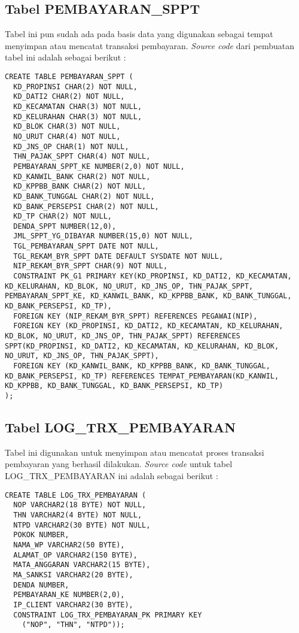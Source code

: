 \documentclass[pdftex,12pt, oneside]{article}
\begin{document}
  \subsection{Tabel PEMBAYARAN\_SPPT}
  
  Tabel ini pun sudah ada pada basis data yang digunakan sebagai tempat menyimpan atau mencatat transaksi pembayaran. \textit{Source code} dari pembuatan tabel ini adalah sebagai berikut :
  
  \begin{lstlisting}
CREATE TABLE PEMBAYARAN_SPPT (
  KD_PROPINSI CHAR(2) NOT NULL,
  KD_DATI2 CHAR(2) NOT NULL,
  KD_KECAMATAN CHAR(3) NOT NULL,
  KD_KELURAHAN CHAR(3) NOT NULL,
  KD_BLOK CHAR(3) NOT NULL,
  NO_URUT CHAR(4) NOT NULL,
  KD_JNS_OP CHAR(1) NOT NULL,
  THN_PAJAK_SPPT CHAR(4) NOT NULL,
  PEMBAYARAN_SPPT_KE NUMBER(2,0) NOT NULL,
  KD_KANWIL_BANK CHAR(2) NOT NULL,
  KD_KPPBB_BANK CHAR(2) NOT NULL,
  KD_BANK_TUNGGAL CHAR(2) NOT NULL,
  KD_BANK_PERSEPSI CHAR(2) NOT NULL,
  KD_TP CHAR(2) NOT NULL,
  DENDA_SPPT NUMBER(12,0),
  JML_SPPT_YG_DIBAYAR NUMBER(15,0) NOT NULL,
  TGL_PEMBAYARAN_SPPT DATE NOT NULL,
  TGL_REKAM_BYR_SPPT DATE DEFAULT SYSDATE NOT NULL,
  NIP_REKAM_BYR_SPPT CHAR(9) NOT NULL,
  CONSTRAINT PK_G1 PRIMARY KEY(KD_PROPINSI, KD_DATI2, KD_KECAMATAN, KD_KELURAHAN, KD_BLOK, NO_URUT, KD_JNS_OP, THN_PAJAK_SPPT, PEMBAYARAN_SPPT_KE, KD_KANWIL_BANK, KD_KPPBB_BANK, KD_BANK_TUNGGAL, KD_BANK_PERSEPSI, KD_TP),
  FOREIGN KEY (NIP_REKAM_BYR_SPPT) REFERENCES PEGAWAI(NIP),
  FOREIGN KEY (KD_PROPINSI, KD_DATI2, KD_KECAMATAN, KD_KELURAHAN, KD_BLOK, NO_URUT, KD_JNS_OP, THN_PAJAK_SPPT) REFERENCES SPPT(KD_PROPINSI, KD_DATI2, KD_KECAMATAN, KD_KELURAHAN, KD_BLOK, NO_URUT, KD_JNS_OP, THN_PAJAK_SPPT),
  FOREIGN KEY (KD_KANWIL_BANK, KD_KPPBB_BANK, KD_BANK_TUNGGAL, KD_BANK_PERSEPSI, KD_TP) REFERENCES TEMPAT_PEMBAYARAN(KD_KANWIL, KD_KPPBB, KD_BANK_TUNGGAL, KD_BANK_PERSEPSI, KD_TP)
);
  \end{lstlisting}
  
  \subsection{Tabel LOG\_TRX\_PEMBAYARAN}
  
  Tabel ini digunakan untuk menyimpan atau mencatat proses transaksi pembayaran yang berhasil dilakukan. \textit{Source code} untuk tabel LOG\_TRX\_PEMBAYARAN ini adalah sebagai berikut :
  
  \begin{lstlisting}    
CREATE TABLE LOG_TRX_PEMBAYARAN (	
  NOP VARCHAR2(18 BYTE) NOT NULL,
  THN VARCHAR2(4 BYTE) NOT NULL,
  NTPD VARCHAR2(30 BYTE) NOT NULL,
  POKOK NUMBER,
  NAMA_WP VARCHAR2(50 BYTE),
  ALAMAT_OP VARCHAR2(150 BYTE),
  MATA_ANGGARAN VARCHAR2(15 BYTE),
  MA_SANKSI VARCHAR2(20 BYTE),
  DENDA NUMBER,
  PEMBAYARAN_KE NUMBER(2,0),
  IP_CLIENT VARCHAR2(30 BYTE),
  CONSTRAINT LOG_TRX_PEMBAYARAN_PK PRIMARY KEY 
    ("NOP", "THN", "NTPD"));  
  \end{lstlisting}
  
\end{document}

